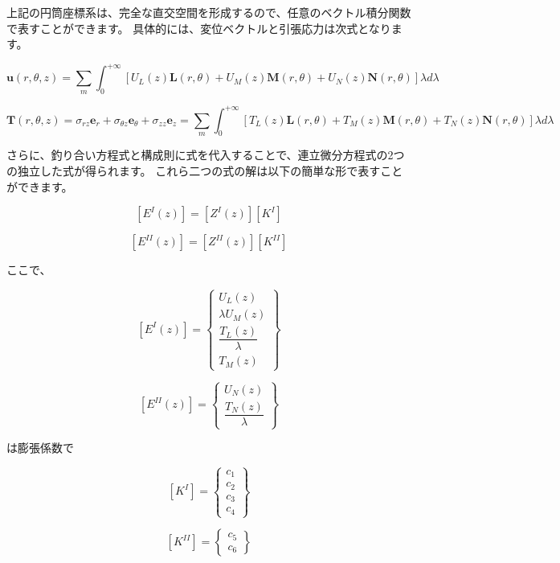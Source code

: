 上記の円筒座標系は、完全な直交空間を形成するので、任意のベクトル積分関数で表すことができます。
具体的には、変位ベクトルと引張応力は次式となります。

\[\mathbf{u}\left(r,\theta,z\right)=\sum_{m}\int_{0}^{+\infty}\left[U_{L}\left(z\right)\mathbf{L}\left(r,\theta\right)+U_{M}\left(z\right)\mathbf{M}\left(r,\theta\right)+U_{N}\left(z\right)\mathbf{N}\left(r,\theta\right)\right]\lambda d\lambda\]

\[\mathbf{T}\left(r,\theta,z\right)=\sigma_{rz}\mathbf{e}_{r}+\sigma_{\theta z}\mathbf{e}_{\theta}+\sigma_{zz}\mathbf{e}_{z}=\sum_{m}\int_{0}^{+\infty}\left[T_{L}\left(z\right)\mathbf{L}\left(r,\theta\right)+T_{M}\left(z\right)\mathbf{M}\left(r,\theta\right)+T_{N}\left(z\right)\mathbf{N}\left(r,\theta\right)\right]\lambda d\lambda\]

さらに、釣り合い方程式と構成則に式を代入することで、連立微分方程式の2つの独立した式が得られます。
これら二つの式の解は以下の簡単な形で表すことができます。

\[\left[E^{I}\left(z\right)\right]=\left[Z^{I}\left(z\right)\right]\left[K^{I}\right]\]

\[\left[E^{II}\left(z\right)\right]=\left[Z^{II}\left(z\right)\right]\left[K^{II}\right]\]

ここで、

\[\left[E^{I}\left(z\right)\right]=\left\{\begin{array}{c}U_{L}\left(z\right)\\\lambda U_{M}\left(z\right)\\\dfrac{T_{L}\left(z\right)}{\lambda}\\T_{M}\left(z\right)\end{array}\right\}\]

\[\left[E^{II}\left(z\right)\right]=\left\{\begin{array}{c}U_{N}\left(z\right)\\\dfrac{T_{N}\left(z\right)}{\lambda}\end{array}\right\}\]

は膨張係数で

\[\left[K^{I}\right]=\left\{\begin{array}{c}c_{1}\\c_{2}\\c_{3}\\c_{4}\end{array}\right\}\]

\[\left[K^{II}\right]=\left\{\begin{array}{c}c_{5}\\c_{6}\end{array}\right\}\]

